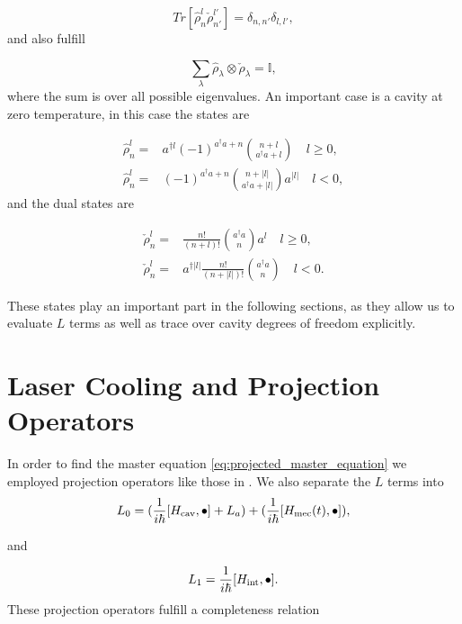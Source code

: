 \documentclass[reprint, amsmath,amssymb, aps,pra]{revtex4-1}
\begin{document}
\begin{equation}
Tr[\hat{\rho}_n^l\check{\rho}_{n'}^{l'}] = \delta_{n,n'}\delta_{l,l'},
\end{equation} and also fulfill

\begin{equation}\label{DampingBasisCompleteness}
\sum_{\lambda} \hat{\rho}_\lambda \otimes \check{\rho}_\lambda = \mathbb{I},
\end{equation} where the sum is over all possible eigenvalues. An important case is a cavity at zero temperature, in this case the states are \cite{EnglertDB}

\begin{align}\label{DefDBZero}
\hat{\rho}_n^l=&a^{\dagger l}(-1)^{a^\dagger a + n}\binom{n+l}{a^\dagger a+l} \quad l \geq 0, \\
\hat{\rho}_n^l=&(-1)^{a^\dagger a + n}\binom{n+|l|}{a^\dagger a+|l|}a^{|l|} \quad l < 0,
\end{align} and the dual states are

\begin{align}\label{DefDBDualZero}
\check{\rho}_n^l=&\frac{n!}{(n+l)!}\binom{a^\dagger a}{n}a^l \quad l \geq 0, \\
\check{\rho}_n^l=&a^{\dagger|l|}\frac{n!}{(n+|l|)!}\binom{a^\dagger a}{n} \quad l < 0.
\end{align}

These states play an important part in the following sections, as they allow us to evaluate $L$ terms as well as trace over cavity degrees of freedom explicitly.

\section{Laser Cooling and Projection Operators}\label{CoolingAppendix}

In order to find the master equation
\eqref{eq:projected_master_equation} we employed projection operators
like those in \cite{CarmichaelQO}. We also separate the $L$ terms into
\begin{equation}
L_0= (\frac{1}{i\hbar}[H_{\rm cav},\bullet]+L_a) +(\frac{1}{i\hbar}[H_{\rm mec}(t),\bullet]),
\end{equation}

and

\begin{equation}
L_1 = \frac{1}{i\hbar}[H_{\rm int},\bullet].
\end{equation}These projection operators fulfill a completeness
relation
\end{document}
